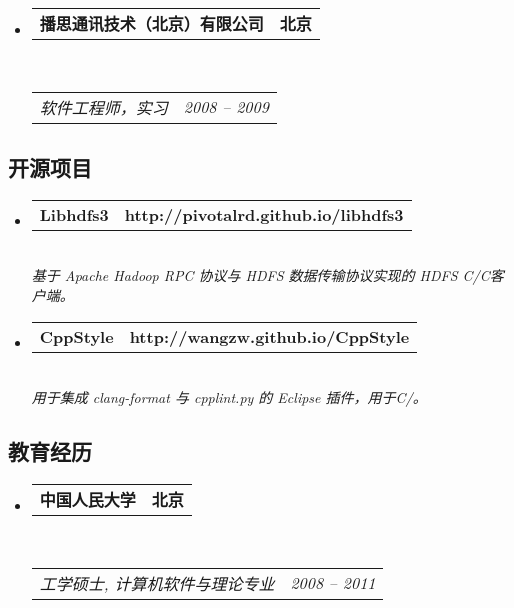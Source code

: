 \documentclass[10pt,letterpaper]{article}
\makeatletter
\newcommand{\headerrow}[2]
{\begin{tabular*}{\linewidth}{l@{\extracolsep{\fill}}r}
	#1 &
	#2 \\
\end{tabular*}}
\newcommand{\CPP}
{C\nolinebreak[4]\hspace{-.05em}\raisebox{.22ex}{\footnotesize\bf ++}}
\makeatother
\begin{document}
\begin{CJK}{UTF8}{gbsn}
\begin{itemize}
	\item
	\headerrow
		{\textbf{播思通讯技术（北京）有限公司}}
		{\textbf{北京}}
	\\
	\headerrow
		{\emph{软件工程师，实习}}
		{\emph{2008 -- 2009}}
\end{itemize}

\vspace{-2em}
\subsection*{开源项目}

\begin{itemize}
	\parskip=0.1em

	\item 
	\headerrow
		{\textbf{Libhdfs3}}
		{\textbf{http://pivotalrd.github.io/libhdfs3}}
	\\
	{\emph{基于 Apache Hadoop RPC 协议与 HDFS 数据传输协议实现的 HDFS C/\CPP 客户端。}}
	
	\item 
	\headerrow
		{\textbf{CppStyle}}
		{\textbf{http://wangzw.github.io/CppStyle}}
	\\
	{\emph{用于集成 clang-format 与 cpplint.py 的 Eclipse 插件，用于C/。}}

\end{itemize}

\vspace{-2em}
\subsection*{教育经历}

\begin{itemize}
	\parskip=0.1em

	\item 
	\headerrow
		{\textbf{中国人民大学}}
		{\textbf{北京}}
	\\
	\headerrow
		{\emph{工学硕士, 计算机软件与理论专业}}
		{\emph{2008 -- 2011}}


\end{itemize}
\end{CJK}
\end{document}
